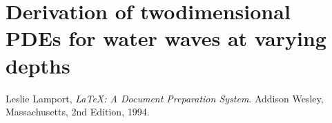 \documentclass[]{report}
\begin{document}
\appendix
\chapter{Derivation of twodimensional PDEs for water waves at varying depths}


\iffalse




\else

\begin{thebibliography}{99}
    
    Leslie Lamport,
    \emph{\LaTeX: A Document Preparation System}.
    Addison Wesley, Massachusetts,
    2nd Edition,
    1994.
    
\end{thebibliography}

\fi
\end{document}
